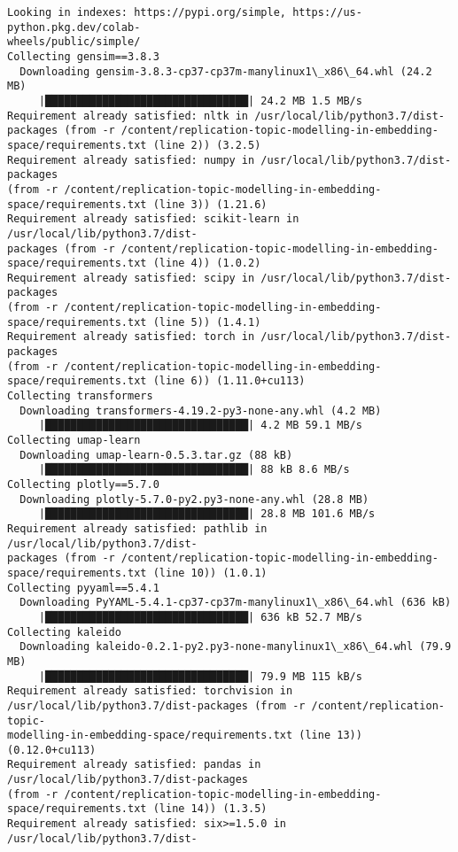 \documentclass[11pt]{article}
\begin{document}
    \begin{Verbatim}[commandchars=\\\{\}]
Looking in indexes: https://pypi.org/simple, https://us-python.pkg.dev/colab-
wheels/public/simple/
Collecting gensim==3.8.3
  Downloading gensim-3.8.3-cp37-cp37m-manylinux1\_x86\_64.whl (24.2 MB)
     |████████████████████████████████| 24.2 MB 1.5 MB/s
Requirement already satisfied: nltk in /usr/local/lib/python3.7/dist-
packages (from -r /content/replication-topic-modelling-in-embedding-
space/requirements.txt (line 2)) (3.2.5)
Requirement already satisfied: numpy in /usr/local/lib/python3.7/dist-packages
(from -r /content/replication-topic-modelling-in-embedding-
space/requirements.txt (line 3)) (1.21.6)
Requirement already satisfied: scikit-learn in /usr/local/lib/python3.7/dist-
packages (from -r /content/replication-topic-modelling-in-embedding-
space/requirements.txt (line 4)) (1.0.2)
Requirement already satisfied: scipy in /usr/local/lib/python3.7/dist-packages
(from -r /content/replication-topic-modelling-in-embedding-
space/requirements.txt (line 5)) (1.4.1)
Requirement already satisfied: torch in /usr/local/lib/python3.7/dist-packages
(from -r /content/replication-topic-modelling-in-embedding-
space/requirements.txt (line 6)) (1.11.0+cu113)
Collecting transformers
  Downloading transformers-4.19.2-py3-none-any.whl (4.2 MB)
     |████████████████████████████████| 4.2 MB 59.1 MB/s
Collecting umap-learn
  Downloading umap-learn-0.5.3.tar.gz (88 kB)
     |████████████████████████████████| 88 kB 8.6 MB/s
Collecting plotly==5.7.0
  Downloading plotly-5.7.0-py2.py3-none-any.whl (28.8 MB)
     |████████████████████████████████| 28.8 MB 101.6 MB/s
Requirement already satisfied: pathlib in /usr/local/lib/python3.7/dist-
packages (from -r /content/replication-topic-modelling-in-embedding-
space/requirements.txt (line 10)) (1.0.1)
Collecting pyyaml==5.4.1
  Downloading PyYAML-5.4.1-cp37-cp37m-manylinux1\_x86\_64.whl (636 kB)
     |████████████████████████████████| 636 kB 52.7 MB/s
Collecting kaleido
  Downloading kaleido-0.2.1-py2.py3-none-manylinux1\_x86\_64.whl (79.9 MB)
     |████████████████████████████████| 79.9 MB 115 kB/s
Requirement already satisfied: torchvision in
/usr/local/lib/python3.7/dist-packages (from -r /content/replication-topic-
modelling-in-embedding-space/requirements.txt (line 13)) (0.12.0+cu113)
Requirement already satisfied: pandas in /usr/local/lib/python3.7/dist-packages
(from -r /content/replication-topic-modelling-in-embedding-
space/requirements.txt (line 14)) (1.3.5)
Requirement already satisfied: six>=1.5.0 in /usr/local/lib/python3.7/dist-

\end{Verbatim}
\end{document}

